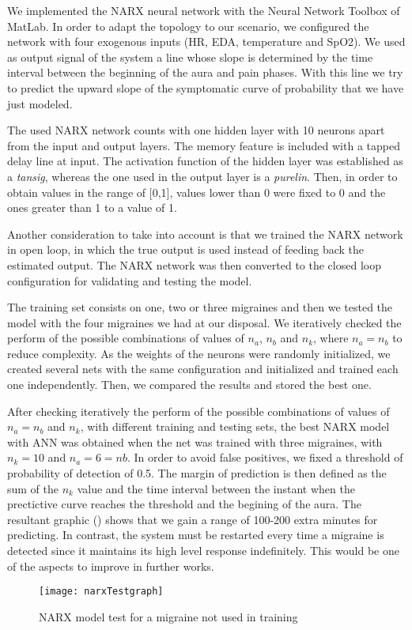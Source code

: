 \label{sec:application:NARX}

We implemented the NARX neural network with the Neural Network Toolbox
of MatLab. In order to adapt the topology to our scenario, we
configured the network with four exogenous inputs (HR, EDA,
temperature and SpO2). We used as output signal of the system a line
whose slope is determined by the time interval between the beginning
of the aura and pain phases. With this line we try to predict the
upward slope of the symptomatic curve of probability that we have just
modeled.

The used NARX network counts with one hidden layer with 10 neurons
apart from the input and output layers.  The memory feature is
included with a tapped delay line at input.  The activation function
of the hidden layer was established as a \textit{tansig}, whereas the
one used in the output layer is a \textit{purelin}. Then, in order to
obtain values in the range of [0,1], values lower than 0 were fixed
to 0 and the ones greater than 1 to a value of 1.

Another consideration to take into account is that we trained the NARX
network in open loop, in which the true output is used instead of
feeding back the estimated output. The NARX network was then converted
to the closed loop configuration for validating and testing the model.

The training set consists on one, two or three migraines and then we
tested the model with the four migraines we had at our disposal.  We
iteratively checked the perform of the possible combinations of values
of $n_{a}$, $n_{b}$ and $n_{k}$, where $n_{a} = n_{b}$ to reduce
complexity. As the weights of the neurons were randomly initialized,
we created several nets with the same configuration and initialized
and trained each one independently. Then, we compared the results and
stored the best one.

After checking iteratively the perform of the possible combinations of
values of $n_{a}=n_{b}$ and $n_{k}$, with different training and
testing sets, the best NARX model with ANN was obtained when the net
was trained with three migraines, with $n_{k}=10$ and $n_{a}=6=n{b}$.
In order to avoid false positives, we fixed a threshold of probability
of detection of 0.5. The margin of prediction is then defined as the
sum of the $n_{k}$ value and the time interval between the instant
when the prectictive curve reaches the threshold and the begining of
the aura. The resultant graphic () shows that we gain
a range of 100-200 extra minutes for predicting. In contrast, the
system must be restarted every time a migraine is detected since it
maintains its high level response indefinitely. This would be one of
the aspects to improve in further works.

\begin{figure}
\centering
\texttt{[image: narxTestgraph]}
\caption{NARX model test for a migraine not used in training}
\label{fig:narxTest}
\end{figure}
